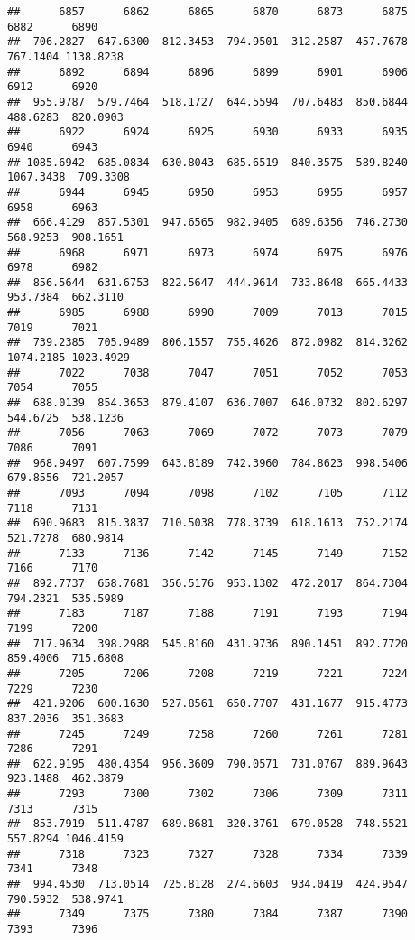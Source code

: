 \documentclass[
]{article}
\begin{document}
\begin{verbatim}
##      6857      6862      6865      6870      6873      6875      6882      6890 
##  706.2827  647.6300  812.3453  794.9501  312.2587  457.7678  767.1404 1138.8238 
##      6892      6894      6896      6899      6901      6906      6912      6920 
##  955.9787  579.7464  518.1727  644.5594  707.6483  850.6844  488.6283  820.0903 
##      6922      6924      6925      6930      6933      6935      6940      6943 
## 1085.6942  685.0834  630.8043  685.6519  840.3575  589.8240 1067.3438  709.3308 
##      6944      6945      6950      6953      6955      6957      6958      6963 
##  666.4129  857.5301  947.6565  982.9405  689.6356  746.2730  568.9253  908.1651 
##      6968      6971      6973      6974      6975      6976      6978      6982 
##  856.5644  631.6753  822.5647  444.9614  733.8648  665.4433  953.7384  662.3110 
##      6985      6988      6990      7009      7013      7015      7019      7021 
##  739.2385  705.9489  806.1557  755.4626  872.0982  814.3262 1074.2185 1023.4929 
##      7022      7038      7047      7051      7052      7053      7054      7055 
##  688.0139  854.3653  879.4107  636.7007  646.0732  802.6297  544.6725  538.1236 
##      7056      7063      7069      7072      7073      7079      7086      7091 
##  968.9497  607.7599  643.8189  742.3960  784.8623  998.5406  679.8556  721.2057 
##      7093      7094      7098      7102      7105      7112      7118      7131 
##  690.9683  815.3837  710.5038  778.3739  618.1613  752.2174  521.7278  680.9814 
##      7133      7136      7142      7145      7149      7152      7166      7170 
##  892.7737  658.7681  356.5176  953.1302  472.2017  864.7304  794.2321  535.5989 
##      7183      7187      7188      7191      7193      7194      7199      7200 
##  717.9634  398.2988  545.8160  431.9736  890.1451  892.7720  859.4006  715.6808 
##      7205      7206      7208      7219      7221      7224      7229      7230 
##  421.9206  600.1630  527.8561  650.7707  431.1677  915.4773  837.2036  351.3683 
##      7245      7249      7258      7260      7261      7281      7286      7291 
##  622.9195  480.4354  956.3609  790.0571  731.0767  889.9643  923.1488  462.3879 
##      7293      7300      7302      7306      7309      7311      7313      7315 
##  853.7919  511.4787  689.8681  320.3761  679.0528  748.5521  557.8294 1046.4159 
##      7318      7323      7327      7328      7334      7339      7341      7348 
##  994.4530  713.0514  725.8128  274.6603  934.0419  424.9547  790.5932  538.9741 
##      7349      7375      7380      7384      7387      7390      7393      7396 

\end{verbatim}
\end{document}
